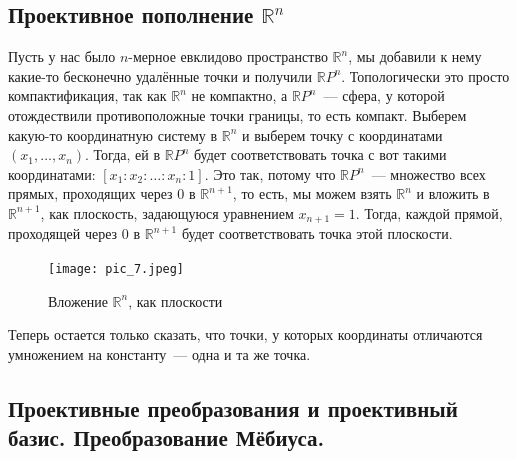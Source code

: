 \documentclass[11pt]{article}
\begin{document}
    \subsection{Проективное пополнение $\mathbb{R}^n$}

    Пусть у нас было $n$-мерное евклидово пространство $\mathbb{R}^n$, мы добавили к нему какие-то бесконечно удалённые точки
    и получили $\mathbb{R}P^n$. Топологически это просто компактификация, так как $\mathbb{R}^n$ не компактно, а $\mathbb{R}P^n$~--- сфера, у которой отождествили противоположные точки границы, то есть компакт.
    Выберем какую-то координатную систему в $ \mathbb{R}^n$ и выберем точку с координатами $(x_1, \ldots, x_n)$.
    Тогда, ей в $\mathbb{R}P^n$ будет соответствовать точка с вот такими координатами: $[x_1 : x_2 : \ldots : x_n : 1]$. Это так, потому что $\mathbb{R}P^n$~--- множество всех прямых, проходящих через 0 в $\mathbb{R}^{n + 1}$, то есть, мы можем взять $\mathbb{R}^n$ и вложить в $\mathbb{R}^{n + 1}$, как плоскость, задающуюся уравнением $x_{n + 1} = 1$. Тогда, каждой прямой, проходящей через 0 в $\mathbb{R}^{n + 1}$ будет соответствовать точка этой плоскости. \\
    \begin{center}
    \begin{figure}[h]
        \centering
        \texttt{[image: pic\_7.jpeg]}
        \caption{Вложение $\mathbb{R}^n$, как плоскости}
    \end{figure}
    \end{center}
    Теперь остается только сказать, что точки, у которых координаты отличаются умножением на константу~--- одна и та же точка.\\

    \subsection{Проективные преобразования и проективный базис. Преобразование Мёбиуса.}
\end{document}
